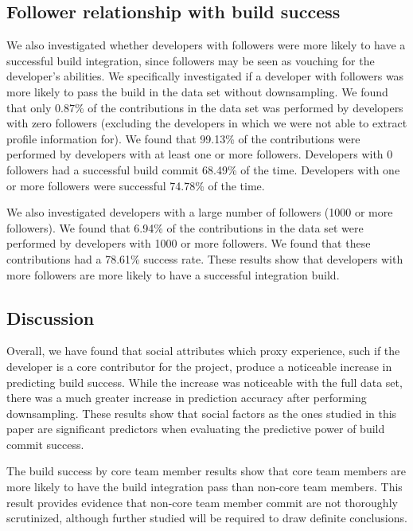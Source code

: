 \documentclass[10pt, conference]{IEEEtran}
\begin{document}
\subsection{Follower relationship with build success}

We also investigated whether developers with followers were more likely to have a
successful build integration, since followers may be seen as vouching for
the developer's abilities.  We specifically investigated if a developer with 
followers was more likely to pass the build in the data set without 
downsampling.  We found that only 0.87\% of the
contributions in the data set was performed by developers with zero 
followers (excluding the developers in which we were not able to extract profile
information for). We found that 99.13\% of the contributions were performed by
developers with at least one or more followers.
Developers with 0 followers had a successful build commit 68.49\%
of the time.  Developers with one or more followers were successful 74.78\% of
the time.

We also investigated developers with a large number of followers (1000 or more
followers).  We found that 6.94\% of the contributions in the data set were
performed by developers with 1000 or more followers.  We found that these
contributions had a 78.61\% success rate.  These results show that developers
with more followers are more likely to have a successful integration build.



\subsection{Discussion}

Overall, we have found that social attributes which proxy experience, such if
the developer is a core contributor for the project, produce a 
noticeable increase in predicting build success.  While the increase was noticeable 
with the full data set, there was a much greater increase in prediction
accuracy after performing downsampling. These results show that social factors
as the ones studied in this paper are significant predictors when
evaluating the predictive power of build commit success.

The build success by core team member results show that core team members are
more likely to have the build integration pass than non-core team members.  This
result provides evidence that non-core team member commit are not thoroughly
scrutinized, although further studied will be required to draw definite
conclusions.
\end{document}
